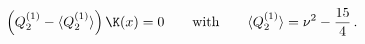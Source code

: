 \begin{equation}\label{eq:wave1}
\left(Q_2^{(1)}-\langle
Q_2^{(1)}\rangle\right)\K(x)=0\qquad\mbox{with}\qquad \langle
Q_2^{(1)}\rangle=\nu^{2}-{{15}\over{4}}\,.
\end{equation}

